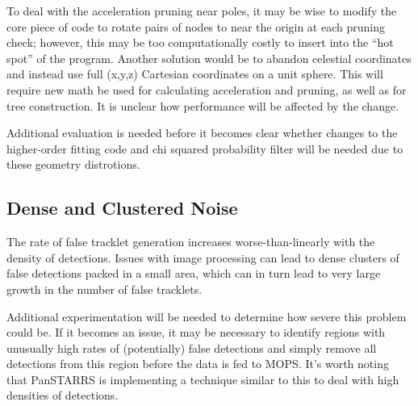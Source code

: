 To deal with the acceleration pruning near poles, it may be wise to
modify the core piece of code to rotate pairs of nodes to near the
origin at each pruning check; however, this may be too computationally
costly to insert into the ``hot spot'' of the program.  Another
solution would be to abandon celestial coordinates and instead use
full (x,y,z) Cartesian coordinates on a unit sphere.  This will
require new math be used for calculating acceleration and pruning, as
well as for tree construction.  It is unclear how performance will be
affected by the change.

Additional evaluation is needed before it becomes clear whether changes to
the higher-order fitting code and chi squared probability filter will
be needed due to these geometry distrotions.


\subsection{Dense and Clustered Noise}

The rate of false tracklet generation increases worse-than-linearly with
the density of detections. Issues with image processing can lead to
dense clusters of false detections packed in a small area, which can
in turn lead to very large growth in the number of false tracklets. 

Additional experimentation will be needed to determine how severe this
problem could be.  If it becomes an issue, it may be necessary to
identify regions with unusually high rates of (potentially) false detections and
simply remove all detections from this region before the data is fed
to MOPS. It's worth noting that PanSTARRS is implementing a technique
similar to this to deal with high densities of detections. 
